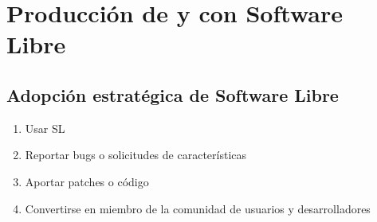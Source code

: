 
\section{Producción de y con Software Libre}

\subsection {Adopción estratégica de Software Libre}
\begin{enumerate}
	\item Usar SL
	\item Reportar bugs o solicitudes de características
	\item Aportar patches o código
	\item Convertirse en miembro de la comunidad de usuarios y desarrolladores
\end{enumerate}

